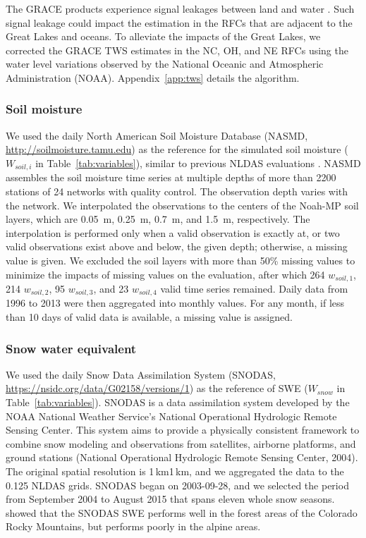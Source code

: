 \documentclass[essd, manuscript]{copernicus}
\begin{document}
The GRACE products experience signal leakages between land and water \citep{save2016JGRSE}. Such signal leakage could impact the estimation in the RFCs that are adjacent to the Great Lakes \citep{ma2017JGRA} and oceans. To alleviate the impacts of the Great Lakes, we corrected the GRACE TWS estimates in the NC, OH, and NE RFCs using the water level variations observed by the National Oceanic and Atmospheric Administration (NOAA). Appendix~\ref{app:tws} details the algorithm.

\subsubsection{Soil moisture}\label{sec:methods:ref:sm}

We used the daily North American Soil Moisture Database (NASMD, \url{http://soilmoisture.tamu.edu}) \citep{quiring2016BAMS} as the reference for the simulated soil moisture (\(W_{soil,i}\) in Table~\ref{tab:variables}), similar to previous NLDAS evaluations \citep{xia2015JHa, xia2015JH}. NASMD assembles the soil moisture time series at multiple depths of more than 2200 stations of 24 networks with quality control. The observation depth varies with the network. We interpolated the observations to the centers of the Noah-MP soil layers, which are \qty{0.05}{m}, \qty{0.25}{m}, \qty{0.7}{m}, and \qty{1.5}{m}, respectively. The interpolation is performed only when a valid observation is exactly at, or two valid observations exist above and below, the given depth; otherwise, a missing value is given. We excluded the soil layers with more than 50\% missing values to minimize the impacts of missing values on the evaluation, after which 264 \(w_{soil,1}\), 214 \(w_{soil,2}\), 95 \(w_{soil,3}\), and 23 \(w_{soil,4}\) valid time series remained. Daily data from 1996 to 2013 were then aggregated into monthly values. For any month, if less than 10 days of valid data is available, a missing value is assigned.

\subsubsection{Snow water equivalent}

We used the daily Snow Data Assimilation System (SNODAS, \url{https://nsidc.org/data/G02158/versions/1}) as the reference of SWE (\(W_{snow}\) in Table~\ref{tab:variables}). SNODAS is a data assimilation system developed by the NOAA National Weather Service's National Operational Hydrologic Remote Sensing Center. This system aims to provide a physically consistent framework to combine snow modeling and observations from satellites, airborne platforms, and ground stations (National Operational Hydrologic Remote Sensing Center, 2004). The original spatial resolution is 1\,km\times{}1\,km, and we aggregated the data to the 0.125\degree{} NLDAS grids. SNODAS began on 2003-09-28, and we selected the period from September 2004 to August 2015 that spans eleven whole snow seasons. \citet{clow2012HP} showed that the SNODAS SWE performs well in the forest areas of the Colorado Rocky Mountains, but performs poorly in the alpine areas.
\end{document}
